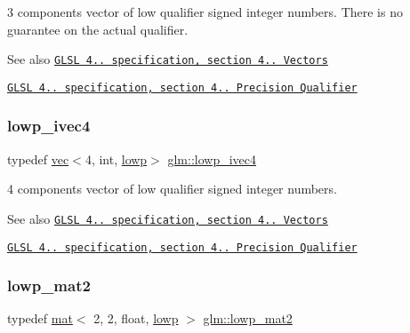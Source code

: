 3 components vector of low qualifier signed integer numbers. There is no guarantee on the actual qualifier.

\begin{DoxySeeAlso}{See also}
\href{http://www.opengl.org/registry/doc/GLSLangSpec.4.20.8.pdf}{\tt G\+L\+SL 4.. specification, section 4.. Vectors} 

\href{http://www.opengl.org/registry/doc/GLSLangSpec.4.20.8.pdf}{\tt G\+L\+SL 4.. specification, section 4.. Precision Qualifier} 
\end{DoxySeeAlso}
\mbox{\label{group__core__precision_ga67d57bf0fc189f8153c7c60ad80ec981}} 
\subsubsection{\texorpdfstring{lowp\+\_\+ivec4}{lowp\_ivec4}}
{\footnotesize\ttfamily typedef \mbox{\hyperlink{structglm_1_1vec}{vec}}$<$4, int, \mbox{\hyperlink{namespaceglm_a36ed105b07c7746804d7fdc7cc90ff25ae161af3fc695e696ce3bf69f7332bc2d}{lowp}}$>$ \mbox{\hyperlink{group__core__precision_ga67d57bf0fc189f8153c7c60ad80ec981}{glm\+::lowp\+\_\+ivec4}}}

4 components vector of low qualifier signed integer numbers.

\begin{DoxySeeAlso}{See also}
\href{http://www.opengl.org/registry/doc/GLSLangSpec.4.20.8.pdf}{\tt G\+L\+SL 4.. specification, section 4.. Vectors} 

\href{http://www.opengl.org/registry/doc/GLSLangSpec.4.20.8.pdf}{\tt G\+L\+SL 4.. specification, section 4.. Precision Qualifier} 
\end{DoxySeeAlso}
\mbox{\label{group__core__precision_ga786e43e2a310fa4bddba3e41b786aa82}} 
\subsubsection{\texorpdfstring{lowp\+\_\+mat2}{lowp\_mat2}}
{\footnotesize\ttfamily typedef \mbox{\hyperlink{structglm_1_1mat}{mat}}$<$ 2, 2, float, \mbox{\hyperlink{namespaceglm_a36ed105b07c7746804d7fdc7cc90ff25ae161af3fc695e696ce3bf69f7332bc2d}{lowp}} $>$ \mbox{\hyperlink{group__core__precision_ga786e43e2a310fa4bddba3e41b786aa82}{glm\+::lowp\+\_\+mat2}}}

